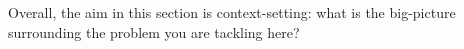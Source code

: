 
Overall, the aim in this section is context-setting: what is the
big-picture surrounding the problem you are tackling here?

